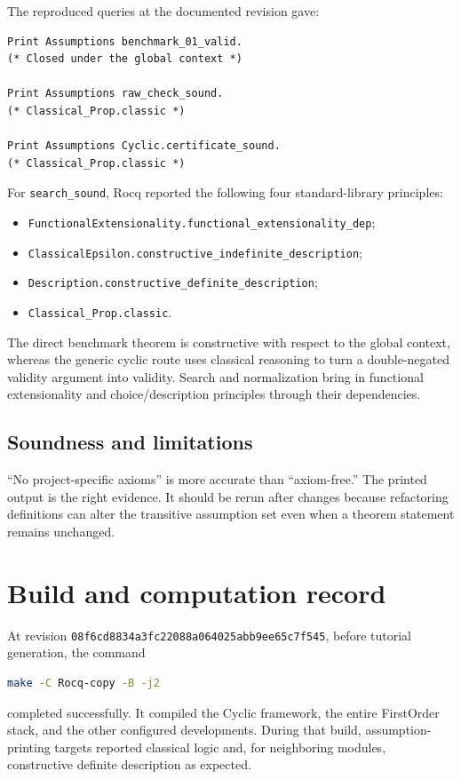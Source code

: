 \documentclass[11pt,oneside]{book}
\DeclareRobustCommand{\code}[1]{\nolinkurl{#1}}
\newcommand{\soundlim}{\subsection*{Soundness and limitations}}
\begin{document}
The reproduced queries at the documented revision gave:
\begin{lstlisting}[caption={Assumption audit.}]
Print Assumptions benchmark_01_valid.
(* Closed under the global context *)

Print Assumptions raw_check_sound.
(* Classical_Prop.classic *)

Print Assumptions Cyclic.certificate_sound.
(* Classical_Prop.classic *)
\end{lstlisting}
For \code{search_sound}, Rocq reported the following four standard-library
principles:
\begin{itemize}[leftmargin=*]
\item \code{FunctionalExtensionality.functional_extensionality_dep};
\item \code{ClassicalEpsilon.constructive_indefinite_description};
\item \code{Description.constructive_definite_description};
\item \code{Classical_Prop.classic}.
\end{itemize}
The direct benchmark theorem is constructive with respect to the global
context, whereas the generic cyclic route uses classical reasoning to turn a
double-negated validity argument into validity.  Search and normalization
bring in functional extensionality and choice/description principles through
their dependencies.

\soundlim

``No project-specific axioms'' is more accurate than ``axiom-free.''  The
printed output is the right evidence.  It should be rerun after changes because
refactoring definitions can alter the transitive assumption set even when a
theorem statement remains unchanged.

\section{Build and computation record}

At revision \code{08f6cd8834a3fc22088a064025abb9ee65c7f545}, before tutorial
generation, the command
\begin{lstlisting}[language=bash,numbers=none]
make -C Rocq-copy -B -j2
\end{lstlisting}
completed successfully.  It compiled the Cyclic framework, the entire
FirstOrder stack, and the other configured developments.  During that build,
assumption-printing targets reported classical logic and, for neighboring
modules, constructive definite description as expected.
\end{document}
